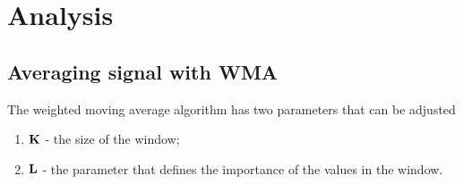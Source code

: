 \documentclass[a4paper,12pt,fleqn]{article}
\begin{document}
        \newpage
        \section{Analysis}

        \subsection{Averaging signal with WMA}

        \hspace{1em} The weighted moving average algorithm has two parameters that can be adjusted

        \begin{enumerate}
                \item \begin{math} \bold{K}\end{math} - the size of the window;
                \item \begin{math}
                    \bold{L}
                \end{math} - the parameter that defines the importance of the values in the window.

                \end{enumerate}
\end{document}

